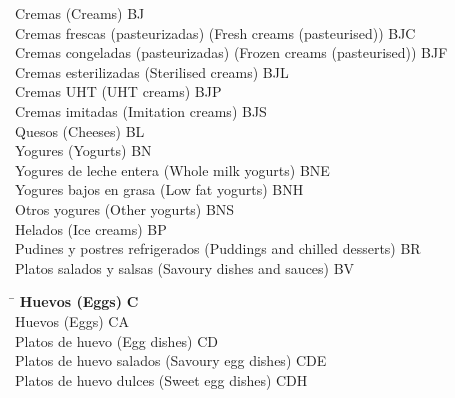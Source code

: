 \begin{small}
\begin{tabbing}
            \hspace{0.5cm}Cremas (Creams) \> BJ \\
                \hspace{1cm}Cremas frescas (pasteurizadas) (Fresh creams (pasteurised)) \> BJC \\
                \hspace{1cm}Cremas congeladas (pasteurizadas) (Frozen creams (pasteurised)) \> BJF \\
                \hspace{1cm}Cremas esterilizadas (Sterilised creams) \> BJL \\
                \hspace{1cm}Cremas UHT (UHT creams) \> BJP \\
                \hspace{1cm}Cremas imitadas (Imitation creams) \> BJS \\
            \hspace{0.5cm}Quesos (Cheeses) \> BL \\
            \hspace{0.5cm}Yogures (Yogurts) \> BN \\
                \hspace{1cm}Yogures de leche entera (Whole milk yogurts) \> BNE \\
                \hspace{1cm}Yogures bajos en grasa (Low fat yogurts) \> BNH \\
                \hspace{1cm}Otros yogures (Other yogurts) \> BNS \\
            \hspace{0.5cm}Helados (Ice creams) \> BP \\
            \hspace{0.5cm}Pudines y postres refrigerados (Puddings and chilled desserts) \> BR \\
            \hspace{0.5cm}Platos salados y salsas (Savoury dishes and sauces) \> BV \\
    \end{tabbing}

    \vspace{-1.25cm}
   
    \begin{tabbing}
    \hspace{15cm} \= \hspace{0cm} \kill
        \textbf{Huevos (Eggs)} \> \textbf{C} \\
            \hspace{0.5cm}Huevos (Eggs) \> CA \\
            \hspace{0.5cm}Platos de huevo (Egg dishes) \> CD \\
                \hspace{1cm}Platos de huevo salados (Savoury egg dishes) \> CDE \\
                \hspace{1cm}Platos de huevo dulces (Sweet egg dishes) \> CDH \\
    \end{tabbing}
    

\end{small}
